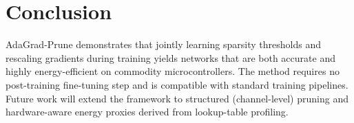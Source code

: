 \section{Conclusion}

AdaGrad-Prune demonstrates that jointly learning sparsity thresholds and
rescaling gradients during training yields networks that are both
accurate and highly energy-efficient on commodity microcontrollers.
The method requires no post-training fine-tuning step and is compatible
with standard training pipelines.  Future work will extend the framework
to structured (channel-level) pruning and hardware-aware energy proxies
derived from lookup-table profiling.

